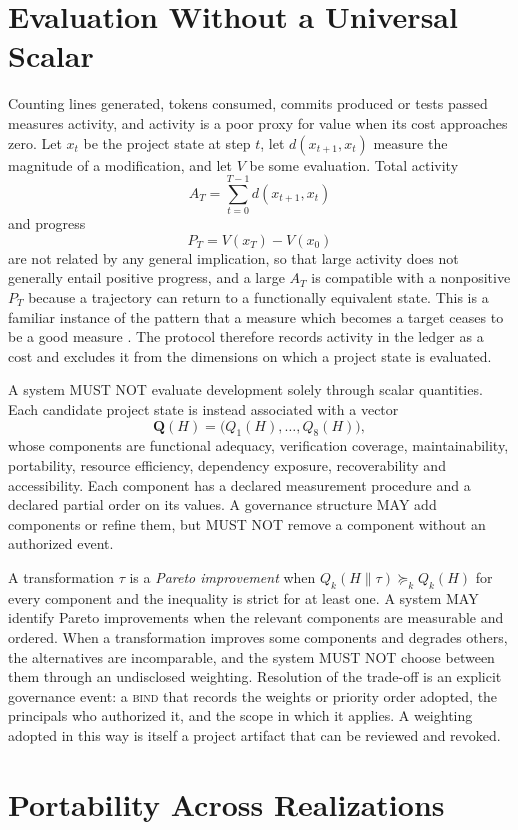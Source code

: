 \documentclass[11pt]{article}
\theoremstyle{remark}
\newcommand{\concat}{\mathbin{\|}}
\newcommand{\BIND}{\textsc{bind}}
\begin{document}
\section{Evaluation Without a Universal Scalar}\label{sec:eval}

Counting lines generated, tokens consumed, commits produced or tests passed measures activity, and activity is a poor proxy for value when its cost approaches zero. Let $x_t$ be the project state at step $t$, let $d(x_{t+1},x_t)$ measure the magnitude of a modification, and let $V$ be some evaluation. Total activity
\[
A_T=\sum_{t=0}^{T-1}d(x_{t+1},x_t)
\]
and progress
\[
P_T=V(x_T)-V(x_0)
\]
are not related by any general implication, so that large activity does not generally entail positive progress, and a large $A_T$ is compatible with a nonpositive $P_T$ because a trajectory can return to a functionally equivalent state. This is a familiar instance of the pattern that a measure which becomes a target ceases to be a good measure \cite{strathern}. The protocol therefore records activity in the ledger as a cost and excludes it from the dimensions on which a project state is evaluated.

A system MUST NOT evaluate development solely through scalar quantities. Each candidate project state is instead associated with a vector
\[
\mathbf Q(H)=\bigl(Q_1(H),\dots,Q_8(H)\bigr),
\]
whose components are functional adequacy, verification coverage, maintainability, portability, resource efficiency, dependency exposure, recoverability and accessibility. Each component has a declared measurement procedure and a declared partial order on its values. A governance structure MAY add components or refine them, but MUST NOT remove a component without an authorized event.

A transformation $\tau$ is a \emph{Pareto improvement} when $Q_k(H\concat\tau)\succeq_k Q_k(H)$ for every component and the inequality is strict for at least one. A system MAY identify Pareto improvements when the relevant components are measurable and ordered. When a transformation improves some components and degrades others, the alternatives are incomparable, and the system MUST NOT choose between them through an undisclosed weighting. Resolution of the trade-off is an explicit governance event: a \BIND{} that records the weights or priority order adopted, the principals who authorized it, and the scope in which it applies. A weighting adopted in this way is itself a project artifact that can be reviewed and revoked.

\section{Portability Across Realizations}\label{sec:port}
\end{document}
